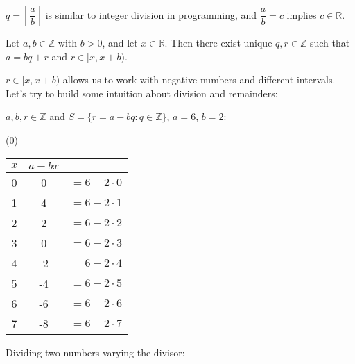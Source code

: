 \begin{Tip}
    $q=\left\lfloor\dfrac{a}{b}\right\rfloor$ is similar to integer division in programming, and $\dfrac{a}{b}=c$ implies $c\in\mathbb{R}$.
\end{Tip}

\newpage

\begin{theo}

    \label{theo:div_alg_ext}

    Let $a, b \in \mathbb{Z}$ with $b > 0$, and let $x \in \mathbb{R}$. Then there exist unique $q, r \in \mathbb{Z}$ such that $a = bq + r$ and $r \in [x, x + b)$.
\end{theo}

\noindent
$r \in [x, x + b)$ allows us to work with negative numbers and different intervals. Let's
try to build some intuition about division and remainders:

\begin{center}
    $a,b,r\in\mathbb{Z}$ and $S=\{r=a-bq:q\in\mathbb{Z}\}$, $a=6$, $b=2$:
\end{center}
\begin{center}
    (0)\qquad
    \begin{tabular}{c|cc}
        $x$ & $a-bx$                \\
        \hline
        0   & 0      & $=6-2\cdot0$ \\
        1   & 4      & $=6-2\cdot1$ \\
        2   & 2      & $=6-2\cdot2$ \\
        3   & 0      & $=6-2\cdot3$ \\
        \hline
        4   & -2     & $=6-2\cdot4$ \\
        5   & -4     & $=6-2\cdot5$ \\
        6   & -6     & $=6-2\cdot6$ \\
        7   & -8     & $=6-2\cdot7$ \\
    \end{tabular}
\end{center}

\noindent
Dividing two numbers varying the divisor:


